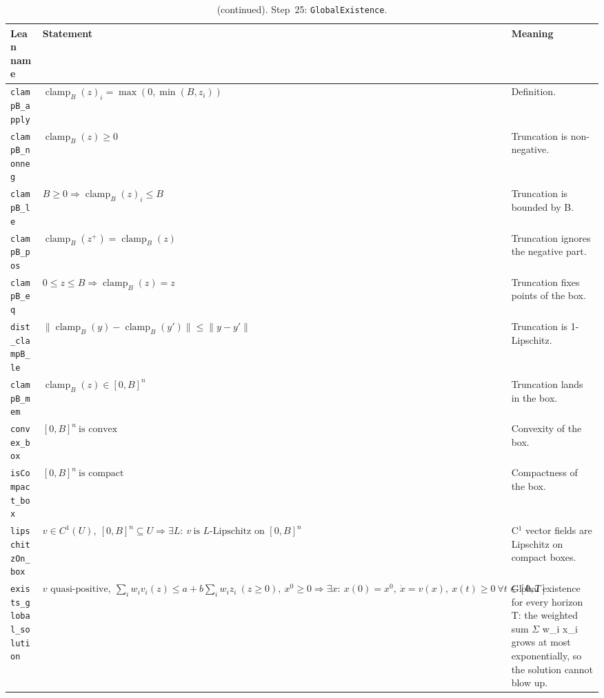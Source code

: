 \addtocounter{table}{-1}
{\small
\begin{longtable}{@{}>{\raggedright\arraybackslash}p{3.6cm}>{\raggedright\arraybackslash}p{6.6cm}>{\raggedright\arraybackslash}p{5.6cm}@{}}
\caption[]{(continued). Step~25: \texttt{GlobalExistence}.}\\
\toprule
Lean name & Statement & Meaning \\
\midrule
\endhead
\texttt{clampB\_\allowbreak{}apply} & $\displaystyle \operatorname{clamp}_B(z)_i=\max(0,\min(B,z_i))$ & Definition. \\[3pt]
\texttt{clampB\_\allowbreak{}nonneg} & $\displaystyle \operatorname{clamp}_B(z)\ge0$ & Truncation is non-negative. \\[3pt]
\texttt{clampB\_\allowbreak{}le} & $\displaystyle B\ge0\Rightarrow\operatorname{clamp}_B(z)_i\le B$ & Truncation is bounded by B. \\[3pt]
\texttt{clampB\_\allowbreak{}pos} & $\displaystyle \operatorname{clamp}_B(z^+)=\operatorname{clamp}_B(z)$ & Truncation ignores the negative part. \\[3pt]
\texttt{clampB\_\allowbreak{}eq} & $\displaystyle 0\le z\le B\Rightarrow\operatorname{clamp}_B(z)=z$ & Truncation fixes points of the box. \\[3pt]
\texttt{dist\_\allowbreak{}clampB\_\allowbreak{}le} & $\displaystyle \|\operatorname{clamp}_B(y)-\operatorname{clamp}_B(y')\|\le\|y-y'\|$ & Truncation is 1-Lipschitz. \\[3pt]
\texttt{clampB\_\allowbreak{}mem} & $\displaystyle \operatorname{clamp}_B(z)\in[0,B]^n$ & Truncation lands in the box. \\[3pt]
\texttt{convex\_\allowbreak{}box} & $\displaystyle [0,B]^n\ \text{is convex}$ & Convexity of the box. \\[3pt]
\texttt{isCompact\_\allowbreak{}box} & $\displaystyle [0,B]^n\ \text{is compact}$ & Compactness of the box. \\[3pt]
\texttt{lipschitzOn\_\allowbreak{}box} & $\displaystyle v\in C^1(U),\ [0,B]^n\subseteq U\Rightarrow\exists L:\ v\ \text{is }L\text{-Lipschitz on }[0,B]^n$ & C$^1$ vector fields are Lipschitz on compact boxes. \\[3pt]
\texttt{exists\_\allowbreak{}global\_\allowbreak{}solution} & $\displaystyle v\text{ quasi-positive},\ \sum_iw_iv_i(z)\le a+b\sum_iw_iz_i\ (z\ge0),\ x^0\ge0\Rightarrow\exists x:\ x(0)=x^0,\ \dot x=v(x),\ x(t)\ge0\ \forall t\in[0,T]$ & Global existence for every horizon T: the weighted sum $\Sigma$ w\_i x\_i grows at most exponentially, so the solution cannot blow up. \\[3pt]
\bottomrule
\end{longtable}
}

